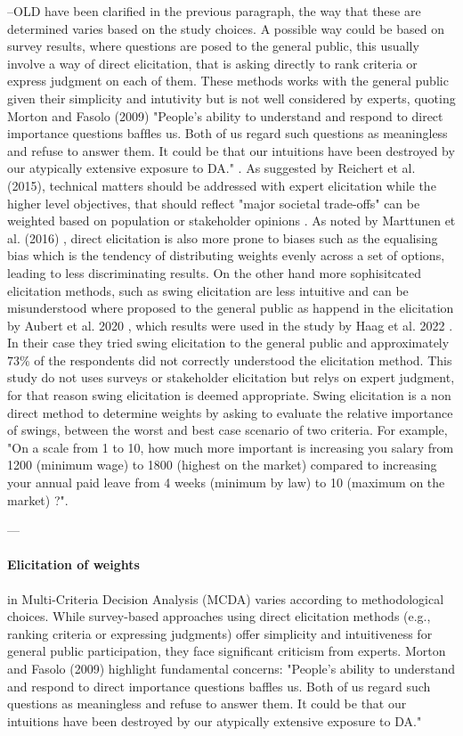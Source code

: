 --OLD
have been clarified in the previous paragraph, the way that these are determined varies based on the study choices. A possible way could be based on survey results, where questions are posed to the general public, this usually involve a way of direct elicitation, that is asking directly to rank criteria or express judgment on each of them. These methods works with the general public given their simplicity and intutivity but is not well considered by experts, quoting Morton and Fasolo (2009) "People’s ability to understand and respond to direct importance questions bafﬂes us. Both of us regard such questions as meaningless and refuse to answer them. It could be that our intuitions have been destroyed by our atypically extensive exposure to DA." \cite{Morton01022009}.
As suggested by Reichert et al. (2015), technical matters should be addressed with expert elicitation while the higher level objectives, that should reflect "major societal trade-offs" can be weighted based on population or stakeholder opinions \cite{REICHERT2015316}. As noted by Marttunen et al. (2016) \cite{MARTTUNEN2018178}, direct elicitation is also more prone to biases such as the equalising bias which is the tendency of distributing weights evenly across a set of options, leading to less discriminating results. On the other hand more sophisitcated elicitation methods, such as swing elicitation are less intuitive and can be misunderstood where proposed to the general public as happend in the elicitation by Aubert et al. 2020 \cite{AUBERT2020100156}, which results were used in the study by Haag et al. 2022 \cite{HAAG2022105361}. In their case they tried swing elicitation to the general public and approximately $73\%$ of the respondents did not correctly understood the elicitation method.
This study do not uses surveys or stakeholder elicitation but relys on expert judgment, for that reason swing elicitation is deemed appropriate. Swing elicitation \cite{Goodwin_Wright_2004} is a non direct method to determine weights by asking to evaluate the relative importance of swings, between the worst and best case scenario of two criteria. For example, "On a scale from 1 to 10, how much more important is increasing you salary from 1200 (minimum wage) to 1800 (highest on the market) compared to increasing your annual paid leave from 4 weeks (minimum by law) to 10 (maximum on the market) ?".

---
\paragraph{Elicitation of weights}
in Multi-Criteria Decision Analysis (MCDA) varies according to methodological choices. While survey-based approaches using direct elicitation methods (e.g., ranking criteria or expressing judgments) offer simplicity and intuitiveness for general public participation, they face significant criticism from experts. Morton and Fasolo (2009) \cite{Morton01022009} highlight fundamental concerns: "People's ability to understand and respond to direct importance questions baffles us. Both of us regard such questions as meaningless and refuse to answer them. It could be that our intuitions have been destroyed by our atypically extensive exposure to DA."

